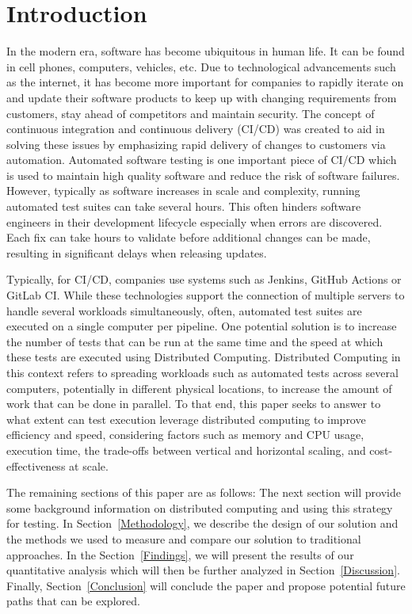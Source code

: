 \section{Introduction}
\label{Introduction}

In the modern era, software has become ubiquitous in human life. It can be found in cell phones, computers, vehicles, etc. Due to technological advancements such as the internet, it has become more important for companies to rapidly iterate on and update their software products to keep up with changing requirements from customers, stay ahead of competitors and maintain security. The concept of continuous integration and continuous delivery (CI/CD) was created to aid in solving these issues by emphasizing rapid delivery of changes to customers via automation. Automated software testing is one important piece of CI/CD which is used to maintain high quality software and reduce the risk of software failures. However, typically as software increases in scale and complexity, running automated test suites can take several hours. This often hinders software engineers in their development lifecycle especially when errors are discovered. Each fix can take hours to validate before additional changes can be made, resulting in significant delays when releasing updates.

Typically, for CI/CD, companies use systems such as Jenkins, GitHub Actions or GitLab CI. While these technologies support the connection of multiple servers to handle several workloads simultaneously, often, automated test suites are executed on a single computer per pipeline. One potential solution is to increase the number of tests that can be run at the same time and the speed at which these tests are executed using Distributed Computing. Distributed Computing in this context refers to spreading workloads such as automated tests across several computers, potentially in different physical locations, to increase the amount of work that can be done in parallel. To that end, this paper seeks to answer to what extent can test execution leverage distributed computing to improve efficiency and speed, considering factors such as memory and CPU usage, execution time, the trade-offs between vertical and horizontal scaling, and cost-effectiveness at scale.

The remaining sections of this paper are as follows: The next section will provide some background information on distributed computing and using this strategy for testing. In Section~\ref{Methodology}, we describe the design of our solution and the methods we used to measure and compare our solution to traditional approaches. In the Section~\ref{Findings}, we will present the results of our quantitative analysis which will then be further analyzed in Section~\ref{Discussion}. Finally, Section~\ref{Conclusion} will conclude the paper and propose potential future paths that can be explored.